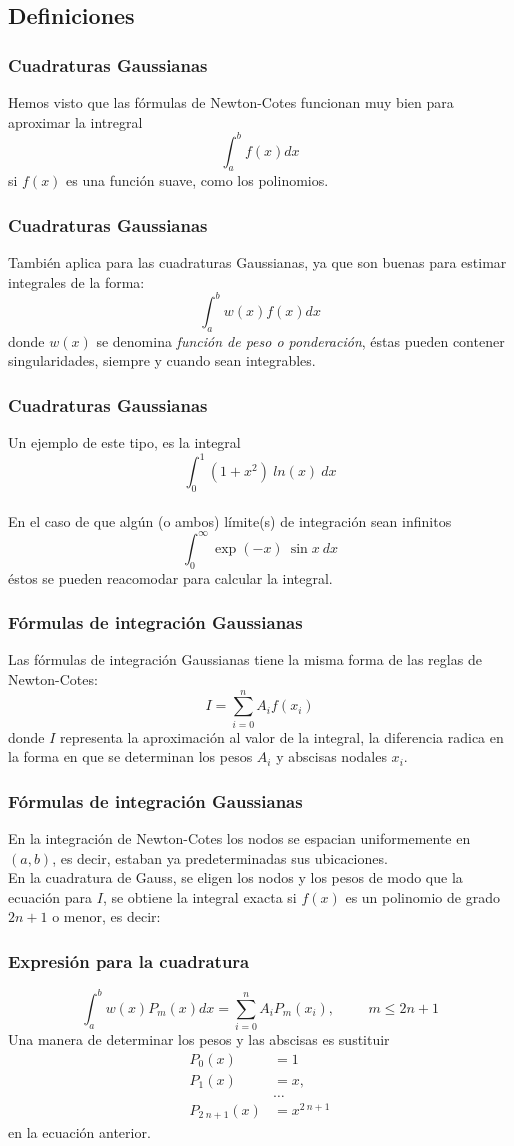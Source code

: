 \subsection{Definiciones}
\begin{frame}
\frametitle{Cuadraturas Gaussianas}
Hemos visto que las fórmulas de Newton-Cotes funcionan muy bien para aproximar la intregral
\[ \int_{a}^{b} f(x) dx\]
si $f(x)$ es una función suave, como los polinomios.
\end{frame}
\begin{frame}
\frametitle{Cuadraturas Gaussianas}
También aplica para las cuadraturas Gaussianas, ya que son buenas para estimar integrales de la forma:
\[ \int_{a}^{b} w(x) f(x) dx\]
donde $w(x)$ se denomina \emph{función de peso o ponderación}, éstas pueden contener singularidades, siempre y cuando sean integrables.
\end{frame}
\begin{frame}
\frametitle{Cuadraturas Gaussianas}
Un ejemplo de este tipo, es la integral
\[ \int_{0}^{1} \left(1+x^{2} \right) \:  ln(x) \: dx \]
\\
\bigskip
\pause
En el caso de que algún (o ambos) límite(s) de integración sean infinitos
\[ \int_{0}^{\infty} \exp(-x) \: \sin x \: dx \]
éstos se pueden reacomodar para calcular la integral.
\end{frame}
\begin{frame}
\frametitle{Fórmulas de integración Gaussianas}
Las fórmulas de integración Gaussianas tiene la misma forma de las reglas de Newton-Cotes:
\[I = \sum_{i=0}^{n} A_{i} f(x_{i})\]
donde $I$ representa la aproximación al valor de la integral, la diferencia radica en la forma en que se determinan los pesos $A_{i}$ y abscisas nodales $x_{i}$.
\end{frame}
\begin{frame}
\frametitle{Fórmulas de integración Gaussianas}
En la integración de Newton-Cotes los nodos se espacian uniformemente en $(a, b)$, es decir, estaban ya predeterminadas sus ubicaciones.
\\
\bigskip
En la cuadratura de Gauss, se eligen los nodos y los pesos de modo que la ecuación para $I$, se obtiene la integral exacta si $f(x)$ es un polinomio de grado $2n + 1$ o menor, es decir:
\end{frame}
\begin{frame}
\frametitle{Expresión para la cuadratura}
\[ \int_{a}^{b} w(x) P_{m}(x) dx = \sum_{i=0}^{n} A_{i}P_{m}(x_{i}), \hspace{1cm} m \leq 2n+1\]
\pause
Una manera de determinar los pesos y las abscisas es sustituir 
\begin{align*}
P_{0}(x) &= 1 \\
P_{1}(x) &= x, \\
&\ldots  \\
P_{2 \: n + 1}(x) &= x^{2 \: n + 1}
\end{align*}
en la ecuación anterior.
\end{frame}
